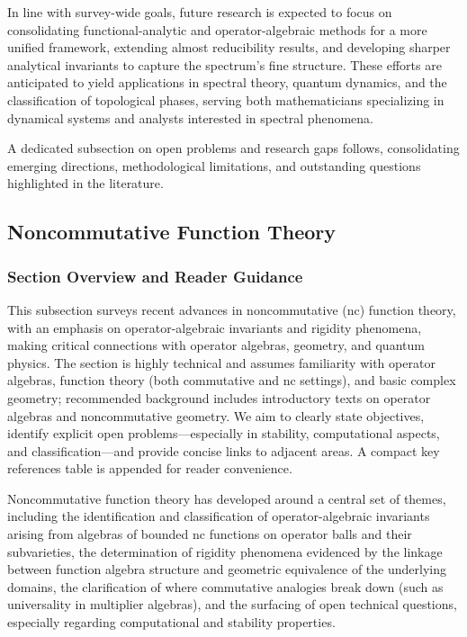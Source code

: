 \documentclass[sigconf]{acmart}
\begin{document}
In line with survey-wide goals, future research is expected to focus on consolidating functional-analytic and operator-algebraic methods for a more unified framework, extending almost reducibility results, and developing sharper analytical invariants to capture the spectrum's fine structure. These efforts are anticipated to yield applications in spectral theory, quantum dynamics, and the classification of topological phases, serving both mathematicians specializing in dynamical systems and analysts interested in spectral phenomena.

A dedicated subsection on open problems and research gaps follows, consolidating emerging directions, methodological limitations, and outstanding questions highlighted in the literature.

\subsection{Noncommutative Function Theory}

\subsubsection*{Section Overview and Reader Guidance}
This subsection surveys recent advances in noncommutative (nc) function theory, with an emphasis on operator-algebraic invariants and rigidity phenomena, making critical connections with operator algebras, geometry, and quantum physics. The section is highly technical and assumes familiarity with operator algebras, function theory (both commutative and nc settings), and basic complex geometry; recommended background includes introductory texts on operator algebras and noncommutative geometry. We aim to clearly state objectives, identify explicit open problems---especially in stability, computational aspects, and classification---and provide concise links to adjacent areas. A compact key references table is appended for reader convenience.

Noncommutative function theory has developed around a central set of themes, including the identification and classification of operator-algebraic invariants arising from algebras of bounded nc functions on operator balls and their subvarieties, the determination of rigidity phenomena evidenced by the linkage between function algebra structure and geometric equivalence of the underlying domains, the clarification of where commutative analogies break down (such as universality in multiplier algebras), and the surfacing of open technical questions, especially regarding computational and stability properties.
\end{document}

